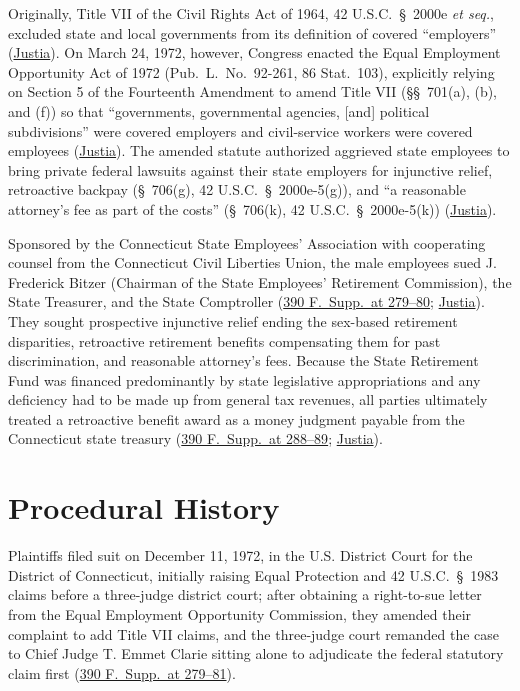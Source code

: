 \documentclass[12pt]{article}
\begin{document}
Originally, Title VII of the Civil Rights Act of 1964, 42 U.S.C.\ \S~2000e \textit{et seq.}, excluded state and local governments from its definition of covered ``employers'' (\href{https://supreme.justia.com/cases/federal/us/427/445/}{Justia}). On March 24, 1972, however, Congress enacted the Equal Employment Opportunity Act of 1972 (Pub.\ L.\ No.\ 92-261, 86 Stat.\ 103), explicitly relying on Section 5 of the Fourteenth Amendment to amend Title VII (\S\S~701(a), (b), and (f)) so that ``governments, governmental agencies, [and] political subdivisions'' were covered employers and civil-service workers were covered employees (\href{https://supreme.justia.com/cases/federal/us/427/445/}{Justia}). The amended statute authorized aggrieved state employees to bring private federal lawsuits against their state employers for injunctive relief, retroactive backpay (\S~706(g), 42 U.S.C.\ \S~2000e-5(g)), and ``a reasonable attorney's fee as part of the costs'' (\S~706(k), 42 U.S.C.\ \S~2000e-5(k)) (\href{https://supreme.justia.com/cases/federal/us/427/445/}{Justia}).

Sponsored by the Connecticut State Employees' Association with cooperating counsel from the Connecticut Civil Liberties Union, the male employees sued J. Frederick Bitzer (Chairman of the State Employees' Retirement Commission), the State Treasurer, and the State Comptroller (\href{https://law.justia.com/cases/federal/district-courts/FSupp/390/278/1966559/}{390 F.\ Supp.\ at 279--80}; \href{https://supreme.justia.com/cases/federal/us/427/445/}{Justia}). They sought prospective injunctive relief ending the sex-based retirement disparities, retroactive retirement benefits compensating them for past discrimination, and reasonable attorney's fees. Because the State Retirement Fund was financed predominantly by state legislative appropriations and any deficiency had to be made up from general tax revenues, all parties ultimately treated a retroactive benefit award as a money judgment payable from the Connecticut state treasury (\href{https://law.justia.com/cases/federal/district-courts/FSupp/390/278/1966559/}{390 F.\ Supp.\ at 288--89}; \href{https://supreme.justia.com/cases/federal/us/427/445/}{Justia}).

\section{Procedural History}

Plaintiffs filed suit on December 11, 1972, in the U.S. District Court for the District of Connecticut, initially raising Equal Protection and 42 U.S.C.\ \S~1983 claims before a three-judge district court; after obtaining a right-to-sue letter from the Equal Employment Opportunity Commission, they amended their complaint to add Title VII claims, and the three-judge court remanded the case to Chief Judge T. Emmet Clarie sitting alone to adjudicate the federal statutory claim first (\href{https://law.justia.com/cases/federal/district-courts/FSupp/390/278/1966559/}{390 F.\ Supp.\ at 279--81}).
\end{document}
